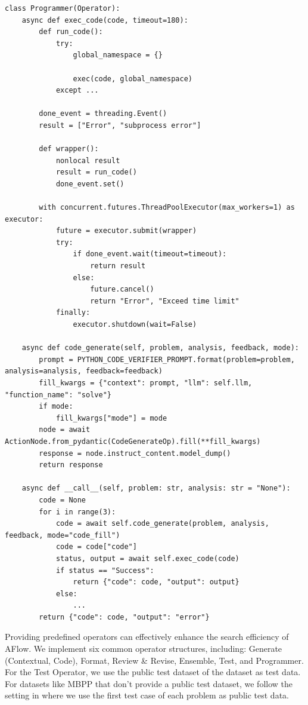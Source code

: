 \documentclass{article} %
\newcommand{\model}{{\sc AFlow}\xspace}
\theoremstyle{plain}
\theoremstyle{definition}
\theoremstyle{remark}
\begin{document}
\begin{tcolorbox}[title={\textbf{\small Operators}}, boxrule=1pt, arc=0mm, colback=black!5!white, colframe=black!75!white, breakable, before skip=10pt, after skip=10pt, pad at break=2mm, parbox=false]
\begin{verbatim}
class Programmer(Operator):
    async def exec_code(code, timeout=180):
        def run_code():
            try:
                global_namespace = {}
                
                exec(code, global_namespace)
            except ...

        done_event = threading.Event()
        result = ["Error", "subprocess error"]

        def wrapper():
            nonlocal result
            result = run_code()
            done_event.set()

        with concurrent.futures.ThreadPoolExecutor(max_workers=1) as executor:
            future = executor.submit(wrapper)
            try:
                if done_event.wait(timeout=timeout):
                    return result
                else:
                    future.cancel()
                    return "Error", "Exceed time limit"
            finally:
                executor.shutdown(wait=False)

    async def code_generate(self, problem, analysis, feedback, mode):
        prompt = PYTHON_CODE_VERIFIER_PROMPT.format(problem=problem, analysis=analysis, feedback=feedback)
        fill_kwargs = {"context": prompt, "llm": self.llm, "function_name": "solve"}
        if mode:
            fill_kwargs["mode"] = mode
        node = await ActionNode.from_pydantic(CodeGenerateOp).fill(**fill_kwargs)
        response = node.instruct_content.model_dump()
        return response

    async def __call__(self, problem: str, analysis: str = "None"):
        code = None
        for i in range(3):
            code = await self.code_generate(problem, analysis, feedback, mode="code_fill")
            code = code["code"]
            status, output = await self.exec_code(code)
            if status == "Success":
                return {"code": code, "output": output}
            else:
                ...
        return {"code": code, "output": "error"}
\end{verbatim}
\end{tcolorbox}

Providing predefined operators can effectively enhance the search efficiency of \model. We implement six common operator structures, including: Generate (Contextual, Code), Format, Review \& Revise, Ensemble, Test, and Programmer. For the Test Operator, we use the public test dataset of the dataset as test data. For datasets like MBPP that don't provide a public test dataset, we follow the setting in \citet{li2024debug} where we use the first test case of each problem as public test data.
\end{document}
